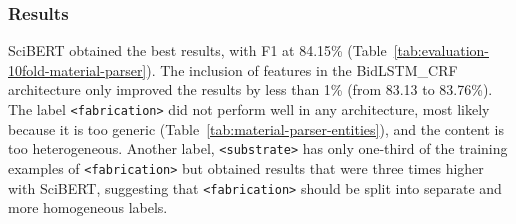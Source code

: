 \subsubsection{Results}

SciBERT obtained the best results, with F1 at 84.15\% (Table~\ref{tab:evaluation-10fold-material-parser}).
The inclusion of features in the BidLSTM\_CRF architecture only improved the results by less than 1\% (from 83.13 to 83.76\%).
The label \texttt{<fabrication>} did not perform well in any architecture, most likely because it is too generic (Table~\ref{tab:material-parser-entities}), and the content is too heterogeneous. Another label, \texttt{<substrate>} has only one-third of the training examples of \texttt{<fabrication>} but obtained results that were three times higher with SciBERT, suggesting that \texttt{<fabrication>} should be split into separate and more homogeneous labels.

